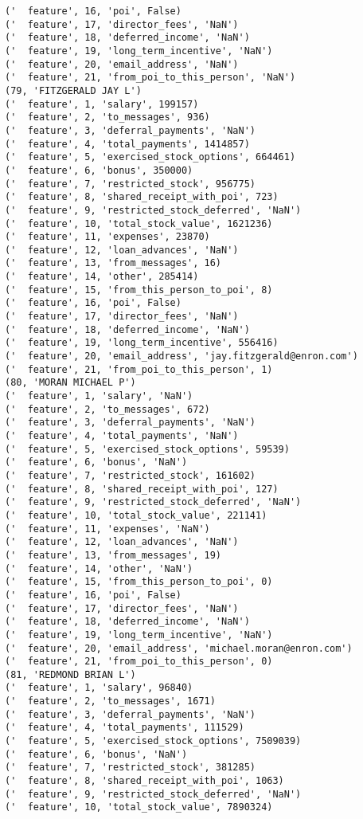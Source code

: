 \begin{verbatim}
('  feature', 16, 'poi', False)
('  feature', 17, 'director_fees', 'NaN')
('  feature', 18, 'deferred_income', 'NaN')
('  feature', 19, 'long_term_incentive', 'NaN')
('  feature', 20, 'email_address', 'NaN')
('  feature', 21, 'from_poi_to_this_person', 'NaN')
(79, 'FITZGERALD JAY L')
('  feature', 1, 'salary', 199157)
('  feature', 2, 'to_messages', 936)
('  feature', 3, 'deferral_payments', 'NaN')
('  feature', 4, 'total_payments', 1414857)
('  feature', 5, 'exercised_stock_options', 664461)
('  feature', 6, 'bonus', 350000)
('  feature', 7, 'restricted_stock', 956775)
('  feature', 8, 'shared_receipt_with_poi', 723)
('  feature', 9, 'restricted_stock_deferred', 'NaN')
('  feature', 10, 'total_stock_value', 1621236)
('  feature', 11, 'expenses', 23870)
('  feature', 12, 'loan_advances', 'NaN')
('  feature', 13, 'from_messages', 16)
('  feature', 14, 'other', 285414)
('  feature', 15, 'from_this_person_to_poi', 8)
('  feature', 16, 'poi', False)
('  feature', 17, 'director_fees', 'NaN')
('  feature', 18, 'deferred_income', 'NaN')
('  feature', 19, 'long_term_incentive', 556416)
('  feature', 20, 'email_address', 'jay.fitzgerald@enron.com')
('  feature', 21, 'from_poi_to_this_person', 1)
(80, 'MORAN MICHAEL P')
('  feature', 1, 'salary', 'NaN')
('  feature', 2, 'to_messages', 672)
('  feature', 3, 'deferral_payments', 'NaN')
('  feature', 4, 'total_payments', 'NaN')
('  feature', 5, 'exercised_stock_options', 59539)
('  feature', 6, 'bonus', 'NaN')
('  feature', 7, 'restricted_stock', 161602)
('  feature', 8, 'shared_receipt_with_poi', 127)
('  feature', 9, 'restricted_stock_deferred', 'NaN')
('  feature', 10, 'total_stock_value', 221141)
('  feature', 11, 'expenses', 'NaN')
('  feature', 12, 'loan_advances', 'NaN')
('  feature', 13, 'from_messages', 19)
('  feature', 14, 'other', 'NaN')
('  feature', 15, 'from_this_person_to_poi', 0)
('  feature', 16, 'poi', False)
('  feature', 17, 'director_fees', 'NaN')
('  feature', 18, 'deferred_income', 'NaN')
('  feature', 19, 'long_term_incentive', 'NaN')
('  feature', 20, 'email_address', 'michael.moran@enron.com')
('  feature', 21, 'from_poi_to_this_person', 0)
(81, 'REDMOND BRIAN L')
('  feature', 1, 'salary', 96840)
('  feature', 2, 'to_messages', 1671)
('  feature', 3, 'deferral_payments', 'NaN')
('  feature', 4, 'total_payments', 111529)
('  feature', 5, 'exercised_stock_options', 7509039)
('  feature', 6, 'bonus', 'NaN')
('  feature', 7, 'restricted_stock', 381285)
('  feature', 8, 'shared_receipt_with_poi', 1063)
('  feature', 9, 'restricted_stock_deferred', 'NaN')
('  feature', 10, 'total_stock_value', 7890324)

\end{verbatim}

